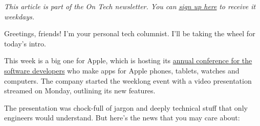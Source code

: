 \emph{This article is part of the On Tech newsletter. You can}
\href{https://www.nytimes3xbfgragh.onion/newsletters/signup/OT}{\emph{sign
up here}} \emph{to receive it weekdays.}

Greetings, friends! I'm your personal tech columnist. I'll be taking the
wheel for today's intro.

This week is a big one for Apple, which is hosting its
\href{https://www.nytimes3xbfgragh.onion/2020/06/22/technology/apple-macs-intel-chips.html}{annual
conference for the software developers} who make apps for Apple phones,
tablets, watches and computers. The company started the weeklong event
with a video presentation streamed on Monday, outlining its new
features.

The presentation was chock-full of jargon and deeply technical stuff
that only engineers would understand. But here's the news that you may
care about:

